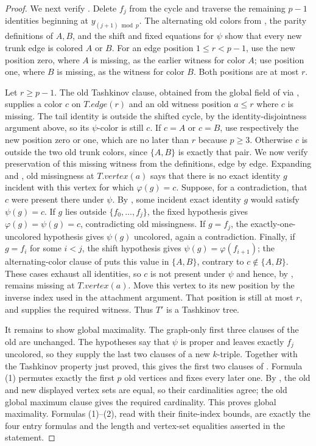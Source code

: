 \begin{proof}
We next verify .  Delete $f_j$ from the cycle and
traverse the remaining $p-1$ identities beginning at
$y_{(j+1)\bmod p}$.  The alternating old colors from
, the parity definitions of $A,B$, and
the shift and fixed equations for $\psi$ show that every new trunk edge is
colored $A$ or $B$.  For an edge position $1\leq r<p-1$, use the new
position zero, where $A$ is missing, as the earlier witness for color $A$;
use position one, where $B$ is missing, as the witness for color $B$.
Both positions are at most $r$.

Let $r\geq p-1$.  The old Tashkinov clause, obtained from the global field
of  via
, supplies a color $c$ on $T.edge(r)$ and an
old witness position $a\leq r$ where $c$ is missing.  The tail identity is
outside the shifted cycle, by the identity-disjointness argument above, so
its $\psi$-color is still $c$.  If $c=A$ or $c=B$, use respectively the
new position zero or one, which are no later than $r$ because $p\geq3$.
Otherwise $c$ is outside the two old trunk colors, since $\{A,B\}$ is
exactly that pair.  We now verify preservation of this missing witness from
the definitions, edge by edge.  Expanding  and
, old missingness at $T.vertex(a)$ says that there is
no exact identity $g$ incident with this vertex for which
$\varphi(g)=c$.  Suppose, for a contradiction, that $c$ were present there
under $\psi$.  By , some incident exact identity $g$
would satisfy $\psi(g)=c$.  If $g$ lies outside
$\{f_0,\ldots,f_j\}$, the fixed hypothesis gives
$\varphi(g)=\psi(g)=c$, contradicting old missingness.  If $g=f_j$, the
exactly-one-uncolored hypothesis  gives
$\psi(g)$ uncolored, again a contradiction.  Finally, if $g=f_i$ for some
$i<j$, the shift hypothesis gives
$\psi(g)=\varphi(f_{i+1})$; the alternating-color clause of
 puts this value in $\{A,B\}$, contrary
to $c\notin\{A,B\}$.  These cases exhaust all identities, so $c$ is not
present under $\psi$ and hence, by , remains missing
at $T.vertex(a)$.  Move this vertex to its new position by the inverse index
used in the attachment argument.  That position is still at most $r$, and
supplies the required witness.  Thus $T'$ is a Tashkinov tree.

It remains to show global maximality.  The graph-only first three clauses
of the old  are unchanged.  The hypotheses say that
$\psi$ is proper and leaves exactly $f_j$ uncolored, so they supply the
last two clauses of a new $k$-triple.  Together with the Tashkinov property
just proved, this gives the first two clauses of
.  Formula (1) permutes exactly the first
$p$ old vertices and fixes every later one.  By
, the old and new displayed vertex sets are
equal, so their cardinalities agree; the old global maximum clause gives
the required cardinality.  This proves global maximality.  Formulas
(1)--(2), read with their finite-index bounds, are exactly the four entry
formulas and the length and vertex-set equalities asserted in the
statement.
\end{proof}
